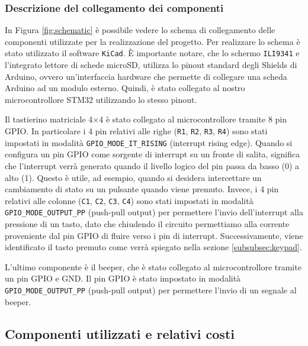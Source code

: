 \documentclass[a4paper]{article}
\begin{document}
\subsubsection{Descrizione del collegamento dei componenti}\label{subsubsec:collegamenti}

In Figura \ref{fig:schematic} è possibile vedere lo schema di collegamento
delle componenti utilizzate per la realizzazione del progetto. Per realizzare lo schema è stato utilizzato il software \texttt{KiCad}. È importante notare, che lo schermo \texttt{ILI9341} e l'integrato lettore di schede microSD, utilizza lo pinout standard degli Shields di Arduino, ovvero un'interfaccia hardware che permette di collegare una scheda Arduino ad un modulo esterno. Quindi, è stato collegato al nostro microcontrollore STM32 utilizzando lo stesso pinout.

Il tastierino matriciale 4$\times$4 è stato collegato al microcontrollore tramite 8 pin GPIO. In particolare i 4 pin relativi alle righe (\texttt{R1}, \texttt{R2}, \texttt{R3}, \texttt{R4}) sono stati impostati in modalità \texttt{GPIO\_MODE\_IT\_RISING} (interrupt rising edge). Quando si configura un pin GPIO come sorgente di interrupt su un fronte di salita, significa che l'interrupt verrà generato quando il livello logico del pin passa da basso (0) a alto (1). Questo è utile, ad esempio, quando si desidera intercettare un cambiamento di stato su un pulsante quando viene premuto. Invece, i 4 pin relativi alle colonne (\texttt{C1}, \texttt{C2}, \texttt{C3}, \texttt{C4}) sono stati impostati in modalità \texttt{GPIO\_MODE\_OUTPUT\_PP} (push-pull output) per permettere l'invio dell'interrupt alla pressione di un tasto, dato che chiudendo il circuito permettiamo alla corrente proveniente dal pin GPIO di fluire verso i pin di interrupt. Successivamente, viene identificato il tasto premuto come verrà spiegato nella sezione \ref{subsubsec:keypad}.

L'ultimo componente è il beeper, che è stato collegato al microcontrollore tramite un pin GPIO e GND. Il pin GPIO è stato impostato in modalità \texttt{GPIO\_MODE\_OUTPUT\_PP} (push-pull output) per permettere l'invio di un segnale al beeper.


\subsection{Componenti utilizzati e relativi costi}
\end{document}
